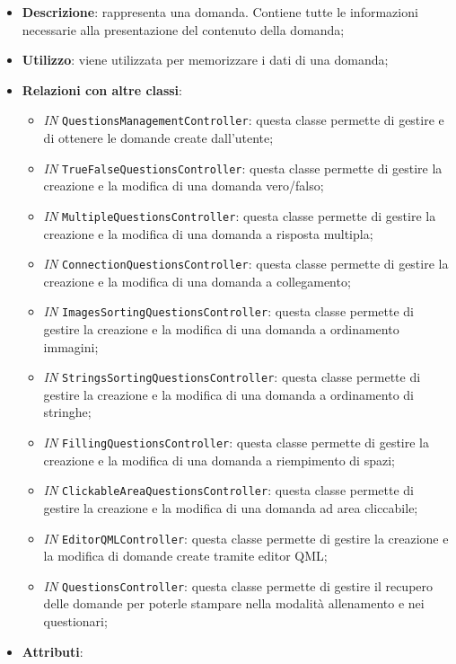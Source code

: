 		\begin{itemize}
			\item \textbf{Descrizione}: rappresenta una domanda. Contiene tutte le informazioni necessarie alla
			presentazione del contenuto della domanda;
			\item \textbf{Utilizzo}: viene utilizzata per memorizzare i dati di una domanda;
			\item \textbf{Relazioni con altre classi}: 
			\begin{itemize}
				\item \textit{IN} \texttt{QuestionsManagementController}: questa classe permette di gestire e di ottenere le domande create dall'utente;
				\item \textit{IN} \texttt{TrueFalseQuestionsController}: questa classe permette di gestire la creazione e la modifica di una domanda vero/falso;
				\item \textit{IN} \texttt{MultipleQuestionsController}: questa classe permette di gestire la creazione e la modifica di una domanda a risposta multipla; 
				\item \textit{IN} \texttt{ConnectionQuestionsController}: questa classe permette di gestire la creazione e la modifica di una domanda a collegamento;
				\item \textit{IN} \texttt{ImagesSortingQuestionsController}: questa classe permette di gestire la creazione e la modifica di una domanda a ordinamento immagini;
				\item \textit{IN} \texttt{StringsSortingQuestionsController}: questa classe permette di gestire la creazione e la modifica di una domanda a ordinamento di stringhe;
				\item \textit{IN} \texttt{FillingQuestionsController}: questa classe permette di gestire la creazione e la modifica di una domanda a riempimento di spazi; 
				\item \textit{IN} \texttt{ClickableAreaQuestionsController}: questa classe permette di gestire la creazione e la modifica di una domanda ad area cliccabile;
				\item \textit{IN} \texttt{EditorQMLController}: questa classe permette di gestire la creazione e la modifica di domande create tramite editor QML;
				\item \textit{IN} \texttt{QuestionsController}: questa classe permette di gestire il recupero delle domande per poterle stampare nella modalità allenamento e nei questionari;
			\end{itemize}
			\item \textbf{Attributi}: 

\end{itemize}
